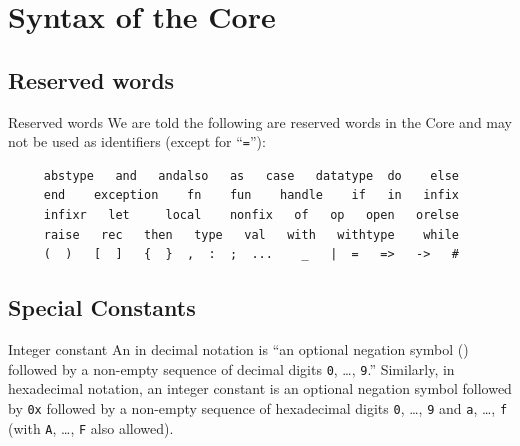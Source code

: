 \chapter{Syntax of the Core}

\section{Reserved words}

\begin{definition}{Reserved words}\label{defn:reserved-words}
We are told the following are reserved words in the Core and may not be
used as identifiers (except for ``\texttt{=}''):
\vspace*{-6pt}
\begin{verbatim}
     abstype   and   andalso   as   case   datatype  do    else
     end    exception    fn    fun    handle    if   in   infix
     infixr   let     local    nonfix   of   op   open   orelse
     raise   rec   then   type   val   with   withtype    while
     (  )   [  ]   {  }  ,  :  ;  ...    _   |  =   =>   ->   #   
\end{verbatim}
\end{definition}

\section{Special Constants}\label{sec:ch2:special-constant}

\begin{definition}{Integer constant}
An  in decimal notation is ``an optional
negation symbol (\tttilde) followed by a non-empty sequence of decimal
digits \texttt{0}, \dots, \texttt{9}.'' Similarly, in hexadecimal
notation, an integer constant is an optional negation symbol followed by
\texttt{0x} followed by a non-empty sequence of hexadecimal digits
\texttt{0}, \dots, \texttt{9} and \texttt{a}, \dots, \texttt{f} (with
\texttt{A}, \dots, \texttt{F} also allowed).
\end{definition}

